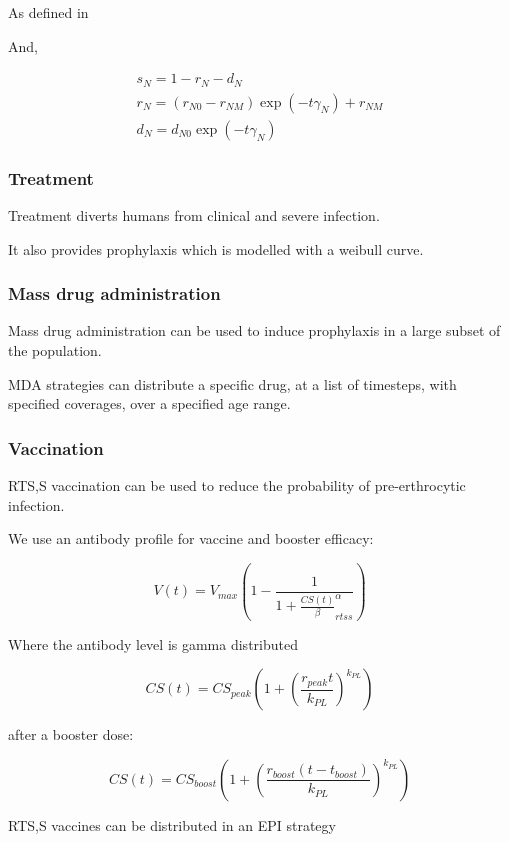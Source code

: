 \documentclass{bmcart}
\begin{document}
As defined in %

And,

\begin{gather*}
    s_N = 1 - r_N - d_N \\ %
    r_N = (r_{N0} - r_{NM})\exp(-t\gamma_N) + r_{NM} \\
    d_N = d_{N0}\exp(-t\gamma_N)
\end{gather*}

\subsubsection*{Treatment}

Treatment diverts humans from clinical and severe infection.

It also provides prophylaxis which is modelled with a weibull curve.


\subsubsection*{Mass drug administration}

Mass drug administration can be used to induce prophylaxis in a large subset of the population.

MDA strategies can distribute a specific drug, at a list of timesteps, with specified coverages, over a specified age range.

\subsubsection*{Vaccination}

RTS,S vaccination can be used to reduce the probability of pre-erthrocytic infection.

We use an antibody profile for vaccine and booster efficacy:

\[
V(t) = V_{max}\left(1 - \frac{1}{1 + \frac{CS(t)}{\beta}^\alpha_{rtss}}\right)
\]

Where the antibody level is gamma distributed

\[
CS(t) = CS_{peak}\left(1 + \left(\frac{r_{peak}t}{k_{PL}}\right)^{k_{PL}}\right)
\]

after a booster dose:

\[
CS(t) = CS_{boost}\left(1 + \left(\frac{r_{boost}(t - t_{boost})}{k_{PL}}\right)^{k_{PL}}\right)
\]

RTS,S vaccines can be distributed in an EPI strategy %
\end{document}

